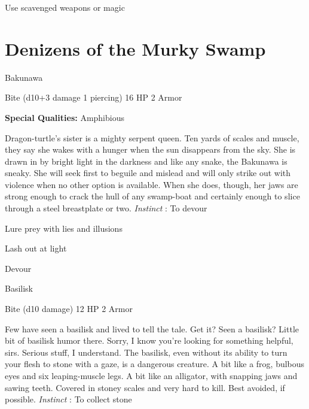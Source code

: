          
\item Use scavenged weapons or magic

       
\stopitemize
                
\section{Denizens of the Murky Swamp}     
            
\startMonsterName
Bakunawa	 
\stopMonsterName
       

Bite (d10+3 damage 1 piercing)	16 HP	2 Armor

       


       
\startMonsterQualities
         {\bf Special Qualities:}  Amphibious
\stopMonsterQualities
       
\startMonsterDescription
Dragon-turtle’s sister is a mighty serpent queen. Ten yards of scales and muscle, they say she wakes with a hunger when the sun disappears from the sky. She is drawn in by bright light in the darkness and like any snake, the Bakunawa is sneaky. She will seek first to beguile and mislead and will only strike out with violence when no other option is available. When she does, though, her jaws are strong enough to crack the hull of any swamp-boat and certainly enough to slice through a steel breastplate or two. {\em Instinct} : To devour
\stopMonsterDescription
       
\startitemize[1,packed]
         
\item Lure prey with lies and illusions

         
\item Lash out at light

         
\item Devour

       
\stopitemize
       
\startMonsterName
Basilisk	 
\stopMonsterName
       

Bite (d10 damage)	12 HP	2 Armor

       


       
\startMonsterDescription
Few have seen a basilisk and lived to tell the tale. Get it? Seen a basilisk? Little bit of basilisk humor there. Sorry, I know you’re looking for something helpful, sirs. Serious stuff, I understand. The basilisk, even without its ability to turn your flesh to stone with a gaze, is a dangerous creature. A bit like a frog, bulbous eyes and six leaping-muscle legs. A bit like an alligator, with snapping jaws and sawing teeth. Covered in stoney scales and very hard to kill. Best avoided, if possible. {\em Instinct} : To collect stone
\stopMonsterDescription
       

